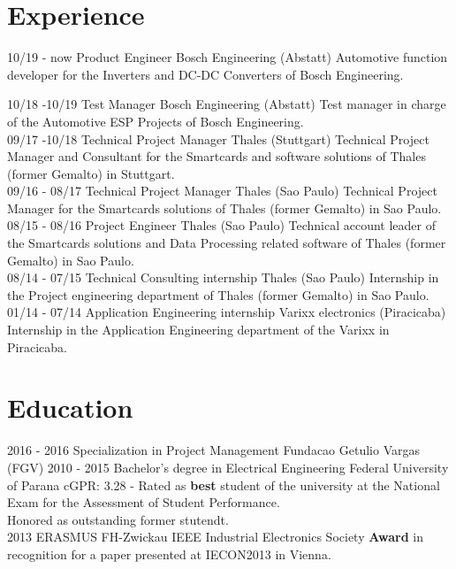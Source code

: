 \documentclass[]{friggeri-cv}
\begin{document}
\section{Experience}
\begin{entrylist}

   \entry
    {10/19 - now}
    {Product Engineer}
    {\normalsize{Bosch Engineering (Abstatt)}}
    {Automotive function developer for the Inverters and DC-DC Converters of Bosch Engineering.
     \\}  
  
  \entry
    {10/18 -10/19}
    {Test Manager}
    {\normalsize{Bosch Engineering (Abstatt)}}
    {Test manager in charge of the Automotive ESP Projects of Bosch Engineering.
     \\}
  \entry
    {09/17 -10/18}
    {Technical Project Manager}
    {\normalsize{Thales (Stuttgart)}}
    {Technical Project Manager and Consultant for the Smartcards and software solutions of Thales (former Gemalto) in Stuttgart. 
     \\}
  \entry
    {09/16 - 08/17}
    {Technical Project Manager}
    {\normalsize{Thales (Sao Paulo)}}
    {Technical Project Manager for the Smartcards solutions of Thales (former Gemalto) in Sao Paulo.
    \\}
    \entry
    {08/15 - 08/16}
    {Project Engineer}
    {\normalsize{Thales (Sao Paulo)}}
    {Technical account leader of the Smartcards solutions and Data Processing related software of Thales (former Gemalto) in Sao Paulo. 
     \\}
    \entry
    {08/14 - 07/15}
    {Technical Consulting internship}
    {\normalsize{Thales (Sao Paulo)}}
    {Internship in the Project engineering department of Thales (former Gemalto) in Sao Paulo.
    \\}
    \entry
    {01/14 - 07/14}
    {Application Engineering internship}
    {\normalsize{Varixx electronics (Piracicaba)}}
    {Internship in the Application Engineering department of the Varixx in Piracicaba.
    \\}
\end{entrylist}
\section{Education}
\begin{entrylist}
  \entry
    {2016 - 2016}
    {Specialization in Project Management}
    {Fundacao Getulio Vargas (FGV)}
    {}
  \entry
    {2010 - 2015}
    {Bachelor's degree in Electrical Engineering}
    {Federal University of Parana}
    {cGPR: 3.28 - Rated as \textbf{best} student of the university at the National Exam for the Assessment of Student Performance.
    \\Honored as outstanding former stutendt.
    \\}
  \entry
    {2013}
    {ERASMUS}
    {FH-Zwickau}
    {IEEE Industrial Electronics Society \textbf{Award} in recognition for a paper presented at IECON2013 in Vienna.}
\end{entrylist}
\end{document}
